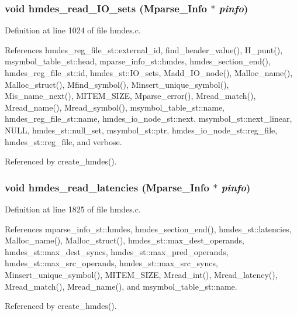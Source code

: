 \subsubsection{\setlength{\rightskip}{0pt plus 5cm}void hmdes\_\-read\_\-IO\_\-sets (\bf{Mparse\_\-Info} $\ast$ {\em pinfo})}\label{hmdes_8h_dd0bc36d354a0e2a80aa51d52fa69bf9}




Definition at line 1024 of file hmdes.c.

References hmdes\_\-reg\_\-file\_\-st::external\_\-id, find\_\-header\_\-value(), H\_\-punt(), msymbol\_\-table\_\-st::head, mparse\_\-info\_\-st::hmdes, hmdes\_\-section\_\-end(), hmdes\_\-reg\_\-file\_\-st::id, hmdes\_\-st::IO\_\-sets, Madd\_\-IO\_\-node(), Malloc\_\-name(), Malloc\_\-struct(), Mfind\_\-symbol(), Minsert\_\-unique\_\-symbol(), Mis\_\-name\_\-next(), MITEM\_\-SIZE, Mparse\_\-error(), Mread\_\-match(), Mread\_\-name(), Mread\_\-symbol(), msymbol\_\-table\_\-st::name, hmdes\_\-reg\_\-file\_\-st::name, hmdes\_\-io\_\-node\_\-st::next, msymbol\_\-st::next\_\-linear, NULL, hmdes\_\-st::null\_\-set, msymbol\_\-st::ptr, hmdes\_\-io\_\-node\_\-st::reg\_\-file, hmdes\_\-st::reg\_\-file, and verbose.

Referenced by create\_\-hmdes().
\subsubsection{\setlength{\rightskip}{0pt plus 5cm}void hmdes\_\-read\_\-latencies (\bf{Mparse\_\-Info} $\ast$ {\em pinfo})}\label{hmdes_8h_471fe0226c28abff0c284e7249168862}




Definition at line 1825 of file hmdes.c.

References mparse\_\-info\_\-st::hmdes, hmdes\_\-section\_\-end(), hmdes\_\-st::latencies, Malloc\_\-name(), Malloc\_\-struct(), hmdes\_\-st::max\_\-dest\_\-operands, hmdes\_\-st::max\_\-dest\_\-syncs, hmdes\_\-st::max\_\-pred\_\-operands, hmdes\_\-st::max\_\-src\_\-operands, hmdes\_\-st::max\_\-src\_\-syncs, Minsert\_\-unique\_\-symbol(), MITEM\_\-SIZE, Mread\_\-int(), Mread\_\-latency(), Mread\_\-match(), Mread\_\-name(), and msymbol\_\-table\_\-st::name.

Referenced by create\_\-hmdes().
